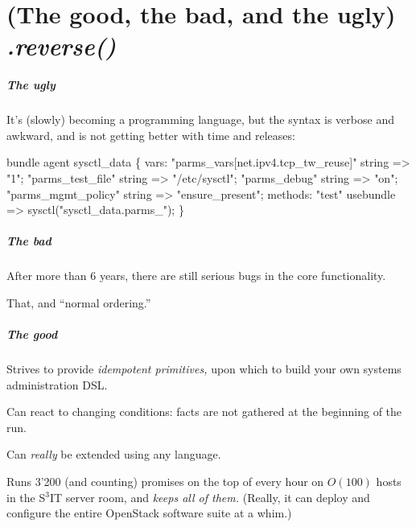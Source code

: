 \documentclass[english,serif,mathserif,usenames,dvipsnames]{beamer}
\begin{document}
\part{(The good, the bad, and the ugly) {\em .reverse(\thinspace)}}
\begin{frame}[fragile]
  \frametitle{The ugly}
  It's (slowly) becoming a programming language, but the syntax is
  verbose and awkward, and is not getting better with time and
  releases:
\begin{semiverbatim}\small
bundle agent sysctl_data \{
vars:
  "parms_vars[net.ipv4.tcp_tw_reuse]" string => "1";
  "parms_test_file" string => "/etc/sysctl";
  "parms_debug" string => "on";
  "parms_mgmt_policy" string => "ensure_present";
methods:
  "test" usebundle => sysctl("sysctl_data.parms_");
\}
\end{semiverbatim}
\end{frame}


\begin{frame}[fragile]
  \frametitle{The bad}

  After more than 6 years, there are still serious bugs in the core
  functionality.


  \+ That, and ``normal ordering.''
\end{frame}


\begin{frame}
  \frametitle{The good}
  Strives to provide \emph{idempotent primitives,} upon which to build
  your own systems administration DSL.

  \+ Can react to changing conditions: facts are not gathered at the
  beginning of the run.

  \+ Can \emph{really} be extended using any language.

  \+ Runs 3'200 (and counting) promises on the top of every hour on
  $O(100)$ hosts in the S${}^3$IT server room, and \emph{keeps all of
    them.} (Really, it can deploy and configure the entire OpenStack
  software suite at a whim.)
\end{frame}


\appendix
\end{document}
